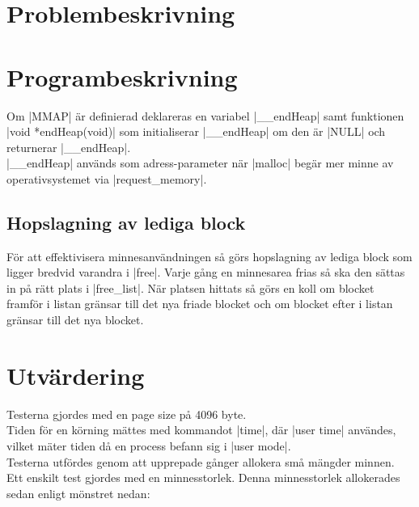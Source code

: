 \documentclass[paper=a4, fontsize=11pt]{scrartcl} %
\numberwithin{equation}{section} %
\numberwithin{figure}{section} %
\numberwithin{table}{section} %
\begin{document}
\section{Problembeskrivning}


\section{Programbeskrivning}

%
%
Om |MMAP| är definierad deklareras en variabel |__endHeap| samt funktionen 
|void *endHeap(void)| som initialiserar |__endHeap| om den är |NULL| och
returnerar |__endHeap|.\\

|__endHeap| används som adress-parameter när |malloc| begär mer minne av
operativsystemet via |request_memory|.

\subsection{Hopslagning av lediga block}
För att effektivisera minnesanvändningen så görs hopslagning av lediga block
som ligger bredvid varandra i |free|.
Varje gång en minnesarea frias så ska den sättas in på rätt plats i |free_list|.
När platsen hittats så görs en koll om blocket framför i listan gränsar till
det nya friade blocket och om blocket efter i listan gränsar till det nya
blocket.


\section{Utvärdering}

Testerna gjordes med en page size på 4096 byte.\\

Tiden för en körning mättes med kommandot |time|, där |user time| användes,
vilket mäter tiden då en process befann sig i |user mode|.\\

Testerna utfördes genom att upprepade gånger allokera små mängder minnen.
Ett enskilt test gjordes med en minnesstorlek.
Denna minnesstorlek allokerades sedan enligt mönstret nedan:
\end{document}
